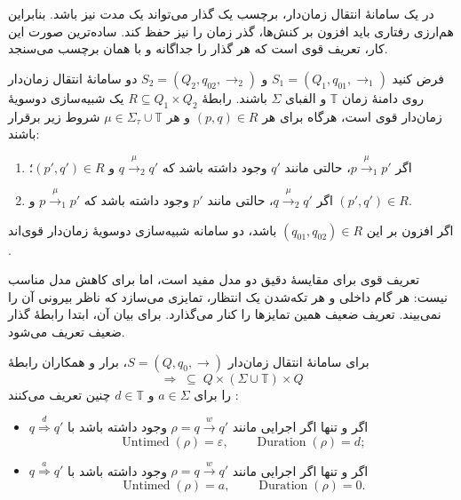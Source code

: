 در یک سامانهٔ انتقال زمان‌دار، برچسب یک گذار می‌تواند یک مدت نیز باشد. بنابراین هم‌ارزی رفتاری باید افزون بر کنش‌ها، گذر زمان را نیز حفظ کند. ساده‌ترین صورت این کار، تعریف قوی است که هر گذار را جداگانه و با همان برچسب می‌سنجد.

\begin{definition}
\label{def:strong-timed-bisimulation}
فرض کنید $S_1=(Q_1,q_{01},\rightarrow_1)$ و $S_2=(Q_2,q_{02},\rightarrow_2)$ دو سامانهٔ انتقال زمان‌دار روی دامنهٔ زمان $\mathbb{T}$ و الفبای $\Sigma$ باشند. رابطهٔ $R\subseteq Q_1\times Q_2$ یک شبیه‌سازی دوسویهٔ زمان‌دار قوی است، هرگاه برای هر $(p,q)\in R$ و هر $\mu\in\Sigma_\tau\cup\mathbb{T}$ شروط زیر برقرار باشند:
\begin{enumerate}
\item اگر $p\xrightarrow{\mu}_1p'$، حالتی مانند $q'$ وجود داشته باشد که $q\xrightarrow{\mu}_2q'$ و $(p',q')\in R$؛
\item اگر $q\xrightarrow{\mu}_2q'$، حالتی مانند $p'$ وجود داشته باشد که $p\xrightarrow{\mu}_1p'$ و $(p',q')\in R$.
\end{enumerate}
اگر افزون بر این $(q_{01},q_{02})\in R$ باشد، دو سامانه شبیه‌سازی دوسویهٔ زمان‌دار قوی‌اند \cite{Cerans1993,LiebEtAl2025}.
\end{definition}

تعریف قوی برای مقایسهٔ دقیق دو مدل مفید است، اما برای کاهش مدل مناسب نیست: هر گام داخلی و هر تکه‌شدن یک انتظار، تمایزی می‌سازد که ناظر بیرونی آن را نمی‌بیند. تعریف ضعیف همین تمایزها را کنار می‌گذارد. برای بیان آن، ابتدا رابطهٔ گذار ضعیف تعریف می‌شود.

\begin{definition}
\label{def:weak-transition}
برای سامانهٔ انتقال زمان‌دار $S=(Q,q_0,\rightarrow)$، برار و همکاران رابطهٔ
\[
\Rightarrow\;\subseteq\;Q\times(\Sigma\cup\mathbb{T})\times Q
\]
را برای $a\in\Sigma$ و $d\in\mathbb{T}$ چنین تعریف می‌کنند \cite{BerardEtAl2008}:
\begin{itemize}
\item $q\overset{d}{\Rightarrow}q'$ اگر و تنها اگر اجرایی مانند $\rho=q\xrightarrow{w}q'$ وجود داشته باشد با
\[
\operatorname{Untimed}(\rho)=\varepsilon,
\qquad
\operatorname{Duration}(\rho)=d;
\]
\item $q\overset{a}{\Rightarrow}q'$ اگر و تنها اگر اجرایی مانند $\rho=q\xrightarrow{w}q'$ وجود داشته باشد با
\[
\operatorname{Untimed}(\rho)=a,
\qquad
\operatorname{Duration}(\rho)=0.
\]
\end{itemize}
\end{definition}

